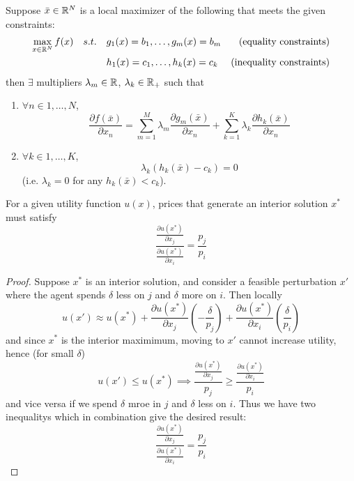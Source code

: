 
\begin{theorem}
  Suppose $\bar x \in {\mathbb R}^N$ is a local maximizer of the following that
  meets the given constraints:
  \begin{align}
    \max_{x \in {\mathbb R}^N} f(x) \quad s.t. \quad 
    & g_1(x) = b_1, \dots, g_m(x) = b_m & \text{(equality constraints)} \notag \\
    & h_1(x) = c_1, \dots, h_k(x) = c_k & \text{(inequality constraints)} \notag
  \end{align}
  then $\exists$ multipliers $\lambda_m \in {\mathbb R}$, $\lambda_k \in {\mathbb R}_+$
  such that
  \begin{enumerate}[(1)]
  \item $\forall n \in 1, \dots, N$,
    \[
    \frac{\partial f(\bar x)}{\partial x_n} 
    = \sum_{m=1}^M \lambda_m \frac{\partial g_m(\bar x)}{\partial x_n}
    + \sum_{k=1}^K \lambda_k \frac{\partial h_k(\bar x)}{\partial x_n}
    \]

  \item $\forall k \in 1, \dots, K$,
    \[
    \lambda_k(h_k(\bar x) - c_k) = 0
    \]
    (i.e. $\lambda_k = 0$ for any $h_k(\bar x) < c_k$).
  \end{enumerate}
\end{theorem}

\begin{prop}
  For a given utility function $u(x)$, prices that generate an
  interior solution $x^*$ must satisfy
  \[
  \frac{
    \frac{\partial u(x^*)}{\partial x_j}
  } {
    \frac{\partial u(x^*)}{\partial x_i}
  }
  = \frac{p_j}{p_i}
  \]
\end{prop}

\begin{proof}
  Suppose $x^*$ is an interior solution, and consider a feasible
  perturbation $x'$ where the agent spends $\delta$ less on $j$ and
  $\delta$ more on $i$. Then locally
  \[
  u(x') \approx u(x^*) 
  + \frac{\partial u(x^*)}{\partial x_j}\left(-\frac{\delta}{p_j}\right)
  + \frac{\partial u(x^*)}{\partial x_i}\left(\frac{\delta}{p_i}\right)
  \]
  and since $x^*$ is the interior maximimum, moving to $x'$ cannot
  increase utility, hence (for small $\delta$)
  \[
  u(x') \leq u(x^*) \implies
  \frac{\frac{\partial u(x^*)}{\partial x_j}}{p_j}
  \geq \frac{\frac{\partial u(x^*)}{\partial x_i}}{p_i}
  \]
  and vice versa if we spend $\delta$ mroe in $j$ and $\delta$ less on
  $i$. Thus we have two inequalitys which in combination give the
  desired result:
  \[
  \frac{
    \frac{\partial u(x^*)}{\partial x_j}
  } {
    \frac{\partial u(x^*)}{\partial x_i}
  }
  = \frac{p_j}{p_i}
  \]
\end{proof}


